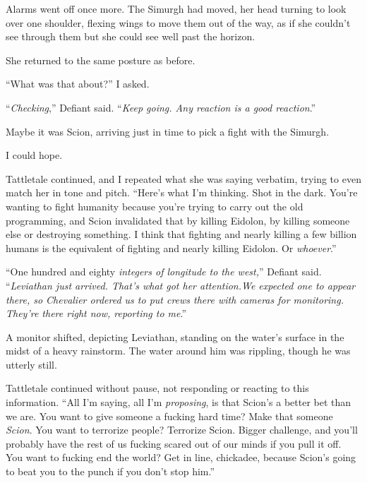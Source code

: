 Alarms went off once more.  The Simurgh had moved, her head turning to look over one shoulder, flexing wings to move them out of the way, as if she couldn't see through them but she could see well past the horizon.



She returned to the same posture as before.



``What was that about?'' I asked.



``\emph{Checking},'' Defiant said.  ``\emph{Keep going.  Any reaction is a good reaction}.''



Maybe it was Scion, arriving just in time to pick a fight with the Simurgh.



I could hope.



Tattletale continued, and I repeated what she was saying verbatim, trying to even match her in tone and pitch.  ``Here's what I'm thinking.  Shot in the dark.  You're wanting to fight humanity because you're trying to carry out the old programming, and Scion invalidated that by killing Eidolon, by killing someone else or destroying something.  I think that fighting and nearly killing a few billion humans is the equivalent of fighting and nearly killing Eidolon.  Or \emph{whoever}.''



``One hundred and eighty\emph{ integers of longitude to the west,}'' Defiant said.  ``\emph{Leviathan just arrived.  That's what got her attention.}\emph{We expected one to appear there, so Chevalier ordered us to put crews there with cameras for monitoring.  They're there right now, reporting to me}.''



A monitor shifted, depicting Leviathan, standing on the water's surface in the midst of a heavy rainstorm.  The water around him was rippling, though he was utterly still.



Tattletale continued without pause, not responding or reacting to this information.  ``All I'm saying, all I'm \emph{proposing}, is that Scion's a better bet than we are.  You want to give someone a fucking hard time?  Make that someone \emph{Scion}.  You want to terrorize people?  Terrorize Scion.  Bigger challenge, and you'll probably have the rest of us fucking scared out of our minds if you pull it off.  You want to fucking end the world?  Get in line, chickadee, because Scion's going to beat you to the punch if you don't stop him.''



